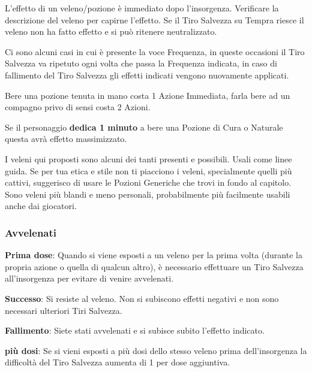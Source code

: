 \begin{multicols}{2}
L'effetto di un veleno/pozione è immediato dopo l'insorgenza. Verificare la descrizione del veleno per capirne l'effetto. Se il Tiro Salvezza su Tempra riesce il veleno non ha fatto effetto e si può ritenere neutralizzato.

Ci sono alcuni casi in cui è presente la voce Frequenza, in queste occasioni il Tiro Salvezza va ripetuto ogni volta che passa la Frequenza indicata, in caso di fallimento del Tiro Salvezza gli effetti indicati vengono nuovamente applicati.

Bere una pozione tenuta in mano costa 1 Azione Immediata, farla bere ad un compagno privo di sensi costa 2 Azioni.

Se il personaggio \textbf{dedica 1 minuto} a bere una Pozione di Cura o Naturale questa avrà effetto massimizzato.


\begin{narratore}
I veleni qui proposti sono alcuni dei tanti presenti e possibili. Usali come linee guida. Se per tua etica e stile non ti piacciono i veleni, specialmente quelli più cattivi, suggerisco di usare le Pozioni Generiche che trovi in fondo al capitolo. Sono veleni più blandi e meno personali, probabilmente più facilmente usabili anche dai giocatori.
\end{narratore}

\subsubsection{Avvelenati}\label{avvelenato}

\textbf{Prima dose}: Quando si viene esposti a un veleno per la prima volta (durante la propria azione o quella di qualcun altro), è necessario effettuare un Tiro Salvezza all'insorgenza per evitare di venire avvelenati.

\textbf{Successo}: Si resiste al veleno. Non si subiscono effetti negativi e non sono necessari ulteriori Tiri Salvezza.

\textbf{Fallimento}: Siete stati avvelenati e si subisce subito l'effetto indicato.

\textbf{più dosi}: Se si vieni esposti a più dosi dello stesso veleno prima dell'insorgenza la difficoltà del Tiro Salvezza aumenta di 1 per dose aggiuntiva.


\end{multicols}
